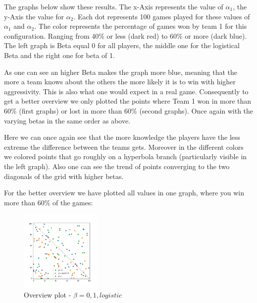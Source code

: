 The graphs below show these results. The x-Axis represents the value of $\alpha_1$, the y-Axis the value for $\alpha_2$. Each dot represents 100 games played for these values of $\alpha_1$ and $\alpha_2$. The color represents the percentage of games won by team 1 for this configuration. Ranging from 40$\%$ or less (dark red) to 60$\%$ or more (dark blue). The left graph is Beta equal 0 for all players, the middle one for the logistical Beta and the right one for beta of 1.

As one can see an higher Beta makes the graph more blue, meaning that the more a team knows about the others the more likely it is to win with higher aggressivity. This is also what one would expect in a real game.
Consequently to get a better overview we only plotted the points where Team 1 won in more than 60$\%$ (first graphs) or lost in more than 60$\%$ (second graphs). Once again with the varying betas in the same order as above.

Here we can once again see that the more knowledge the players have the less extreme the difference between the teams gets. Moreover in the different colors we colored points that go roughly on a hyperbola branch (particularly visible in the left graph). Also one can see the trend of points converging to the two diagonals of the grid with higher betas.


For the better overview we have plotted all values in one graph, where you win  more than 60$\%$ of the games:

\begin{figure}[!ht]
    \centering
    \includegraphics[width=0.35\textwidth]{Bilder/simulation_16}
    \caption{Overview plot - $\beta=0,1,logistic$}
    \label{fig:28}
\end{figure}


